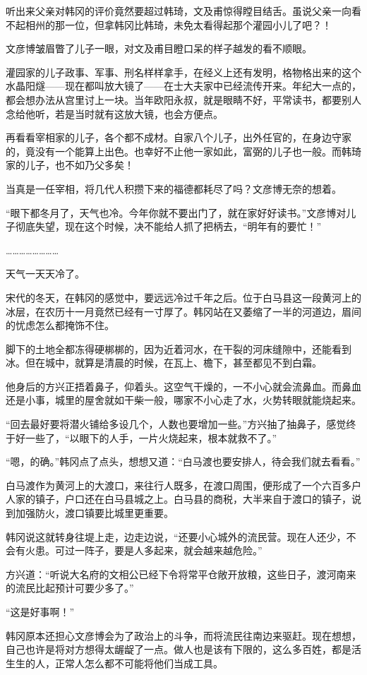 听出来父亲对韩冈的评价竟然要超过韩琦，文及甫惊得瞠目结舌。虽说父亲一向看不起相州的那一位，但拿韩冈比韩琦，未免太看得起那个灌园小儿了吧？！

文彦博皱眉瞥了儿子一眼，对文及甫目瞪口呆的样子越发的看不顺眼。

灌园家的儿子政事、军事、刑名样样拿手，在经义上还有发明，格物格出来的这个水晶阳燧——现在都叫放大镜了——在士大夫家中已经流传开来。年纪大一点的，都会想办法从宫里讨上一块。当年欧阳永叔，就是眼睛不好，平常读书，都要别人念给他听，若是当时就有这放大镜，也会方便点。

再看看宰相家的儿子，各个都不成材。自家八个儿子，出外任官的，在身边守家的，竟没有一个能算上出色。也幸好不止他一家如此，富弼的儿子也一般。而韩琦家的儿子，也不如乃父多矣！

当真是一任宰相，将几代人积攒下来的福德都耗尽了吗？文彦博无奈的想着。

“眼下都冬月了，天气也冷。今年你就不要出门了，就在家好好读书。”文彦博对儿子彻底失望，现在这个时候，决不能给人抓了把柄去，“明年有的要忙！”

……………………

天气一天天冷了。

宋代的冬天，在韩冈的感觉中，要远远冷过千年之后。位于白马县这一段黄河上的冰层，在农历十一月竟然已经有一寸厚了。韩冈站在又萎缩了一半的河道边，眉间的忧虑怎么都掩饰不住。

脚下的土地全都冻得硬梆梆的，因为近着河水，在干裂的河床缝隙中，还能看到冰。但在城中，就算是清晨的时候，在瓦上、檐下，甚至都见不到白霜。

他身后的方兴正捂着鼻子，仰着头。这空气干燥的，一不小心就会流鼻血。而鼻血还是小事，城里的屋舍就如干柴一般，哪家不小心走了水，火势转眼就能烧起来。

“回去最好要将潜火铺给多设几个，人数也要增加一些。”方兴抽了抽鼻子，感觉终于好一些了，“以眼下的人手，一片火烧起来，根本就救不了。”

“嗯，的确。”韩冈点了点头，想想又道：“白马渡也要安排人，待会我们就去看看。”

白马渡作为黄河上的大渡口，来往行人既多，在渡口周围，便形成了一个六百多户人家的镇子，户口还在白马县城之上。白马县的商税，大半来自于渡口的镇子，说到加强防火，渡口镇要比城里更重要。

韩冈说这就转身往堤上走，边走边说，“还要小心城外的流民营。现在人还少，不会有火患。可过一阵子，要是人多起来，就会越来越危险。”

方兴道：“听说大名府的文相公已经下令将常平仓敞开放粮，这些日子，渡河南来的流民比起预计可要少多了。”

“这是好事啊！”

韩冈原本还担心文彦博会为了政治上的斗争，而将流民往南边来驱赶。现在想想，自己也许是将对方想得太龌龊了一点。做人也是该有下限的，这么多百姓，都是活生生的人，正常人怎么都不可能将他们当成工具。

